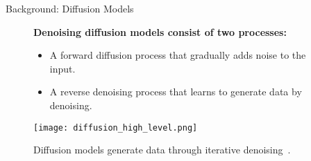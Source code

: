   
  
  \begin{refsection}
  \begin{frame}{Background: Diffusion Models}
  
    \begin{figure}
      \begin{minipage}{0.95\linewidth}
        \footnotesize
        \textbf{Denoising diffusion models consist of two processes:}
        \begin{itemize}
          \item A forward diffusion process that gradually adds noise to the input.
          \item A reverse denoising process that learns to generate data by denoising.
        \end{itemize}
      \end{minipage}
      \vspace{2em}
  
      \centering
      \texttt{[image: diffusion\_high\_level.png]}
  
      \caption[]{\scriptsize Diffusion models generate data through iterative denoising~\parencite{sohl2015deep,ho2020denoising}.}
    \end{figure}
  
    \bottomleftrefs
  \end{frame}
  \end{refsection}
  
